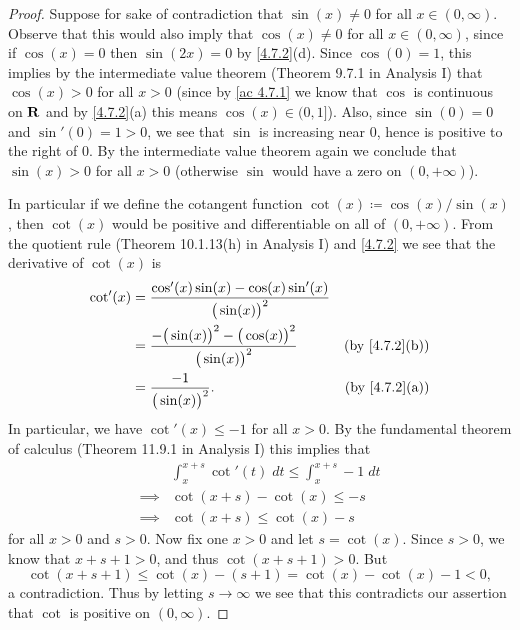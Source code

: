 \begin{proof}
  Suppose for sake of contradiction that \(\sin(x) \neq 0\) for all \(x \in (0, \infty)\).
  Observe that this would also imply that \(\cos(x) \neq 0\) for all \(x \in (0, \infty)\), since if \(\cos(x) = 0\) then \(\sin(2x) = 0\) by \cref{4.7.2}(d).
  Since \(\cos(0) = 1\), this implies by the intermediate value theorem (Theorem 9.7.1 in Analysis I) that \(\cos(x) > 0\) for all \(x > 0\)
  (since by \cref{ac 4.7.1} we know that \(\cos\) is continuous on \(\mathbf{R}\) and by \cref{4.7.2}(a) this means \(\cos(x) \in (0, 1]\)).
  Also, since \(\sin(0) = 0\) and \(\sin'(0) = 1 > 0\), we see that \(\sin\) is increasing near \(0\), hence is positive to the right of \(0\).
  By the intermediate value theorem again we conclude that \(\sin(x) > 0\) for all \(x > 0\)
  (otherwise \(\sin\) would have a zero on \((0, +\infty)\)).

  In particular if we define the cotangent function \(\cot(x) \coloneqq \cos(x) / \sin(x)\), then \(\cot(x)\) would be positive and differentiable on all of \((0, +\infty)\).
  From the quotient rule (Theorem 10.1.13(h) in Analysis I) and \cref{4.7.2} we see that the derivative of \(\cot(x)\) is
  \begin{align*}
    \cot'(x) & = \frac{\cos'(x) \sin(x) - \cos(x) \sin'(x)}{\big(\sin(x)\big)^2}                                      \\
             & = \frac{-\big(\sin(x)\big)^2 - \big(\cos(x)\big)^2}{\big(\sin(x)\big)^2} & \text{(by \cref{4.7.2}(b))} \\
             & = \frac{-1}{\big(\sin(x)\big)^2}.                                        & \text{(by \cref{4.7.2}(a))}
  \end{align*}
  In particular, we have \(\cot'(x) \leq -1\) for all \(x > 0\).
  By the fundamental theorem of calculus (Theorem 11.9.1 in Analysis I) this implies that
  \begin{align*}
             & \int_x^{x + s} \cot'(t) \; dt \leq \int_x^{x + s} -1 \; dt \\
    \implies & \cot(x + s) - \cot(x) \leq -s                              \\
    \implies & \cot(x + s) \leq \cot(x) - s
  \end{align*}
  for all \(x > 0\) and \(s > 0\).
  Now fix one \(x > 0\) and let \(s = \cot(x)\).
  Since \(s > 0\), we know that \(x + s + 1 > 0\), and thus \(\cot(x + s + 1) > 0\).
  But
  \[
    \cot(x + s + 1) \leq \cot(x) - (s + 1) = \cot(x) - \cot(x) - 1 < 0,
  \]
  a contradiction.
  Thus by letting \(s \to \infty\) we see that this contradicts our assertion that \(\cot\) is positive on \((0, \infty)\).
\end{proof}

